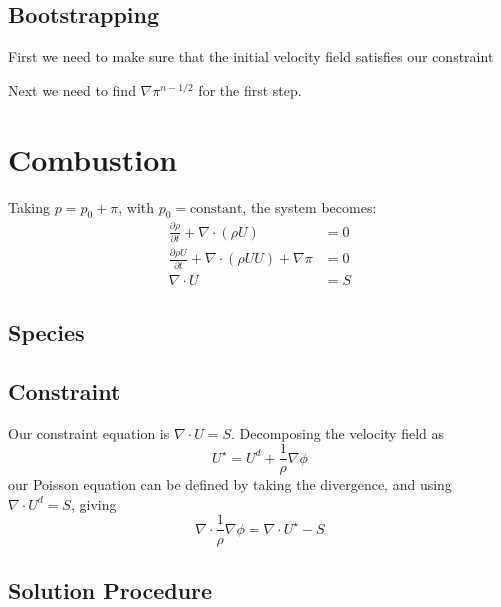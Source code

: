 \subsection{Bootstrapping}

First we need to make sure that the initial velocity field satisfies our constraint

Next we need to find $\nabla \pi^{n-1/2}$ for the first step.



\section{Combustion}


Taking $p = p_0 + \pi$, with $p_0 = \mathrm{constant}$, the system 
becomes:
\begin{align}
\frac{\partial \rho}{\partial t} + \nabla \cdot (\rho U) &= 0 \\
\frac{\partial \rho U}{\partial t} + \nabla \cdot (\rho U U) + \nabla \pi &= 0 \\
\nabla \cdot U &= S
\end{align}

\subsection{Species}


\subsection{Constraint}

Our constraint equation is $\nabla \cdot U = S$.  Decomposing the
velocity field as
\begin{equation}
U^\star = U^d + \frac{1}{\rho} \nabla \phi
\end{equation}
our Poisson equation can be defined by taking the divergence, and
using $\nabla \cdot U^d = S$, giving
\begin{equation}
\nabla \cdot \frac{1}{\rho} \nabla \phi = \nabla \cdot U^\star - S
\end{equation}


\subsection{Solution Procedure}

